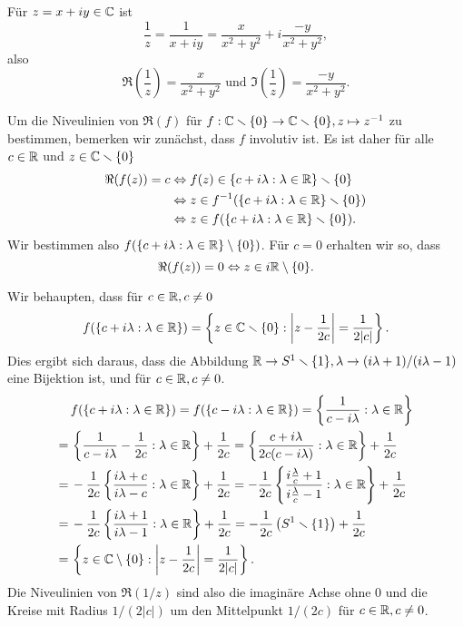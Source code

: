 \documentclass[a4paper,10pt]{article}
\begin{document}
Für $z = x+iy \in \mathbb{C}$ ist
\[
 \frac{1}{z} = \frac{1}{x+iy} = \frac{x}{x^2+y^2} + i\frac{-y}{x^2+y^2},
\]
also
\[
 \Re\left(\frac{1}{z}\right) = \frac{x}{x^2+y^2} \text{ und }
 \Im\left(\frac{1}{z}\right) = \frac{-y}{x^2+y^2}.
\]

Um die Niveulinien von $\Re(f)$ für $f : \mathbb{C} \smallsetminus \{0\} \to \mathbb{C} \smallsetminus \{0\}, z \mapsto z^{-1}$ zu bestimmen, bemerken wir zunächst, dass $f$ involutiv ist. Es ist daher für alle $c \in \mathbb{R}$ und $z \in \mathbb{C} \smallsetminus \{0\}$
\begin{align*}
 \Re(f(z)) = c
 &\Leftrightarrow f(z) \in \{c + i\lambda : \lambda \in \mathbb{R}\} \smallsetminus \{0\} \\
 &\Leftrightarrow z \in f^{-1}(\{c + i\lambda : \lambda \in \mathbb{R}\} \smallsetminus \{0\}) \\
 &\Leftrightarrow z \in f(\{c + i\lambda : \lambda \in \mathbb{R}\} \smallsetminus \{0\}).
\end{align*}
Wir bestimmen also $f(\{c+i\lambda : \lambda \in \mathbb{R}\} \setminus \{0\})$. Für $c = 0$ erhalten wir so, dass
\[
 \Re(f(z)) = 0 \Leftrightarrow z \in i\mathbb{R} \setminus\{0\}.
\]

Wir behaupten, dass für $c \in \mathbb{R}, c \neq 0$
\[
 f(\{c + i\lambda : \lambda \in \mathbb{R}\})
 = \left\{z \in \mathbb{C} \smallsetminus \{0\} : \left|z-\frac{1}{2c}\right| = \frac{1}{2|c|} \right\}.
\]
Dies ergibt sich daraus, dass die Abbildung $\mathbb{R} \to S^1 \smallsetminus\{1\}, \lambda \to (i\lambda+1)/(i\lambda-1)$ eine Bijektion ist, und für $c \in \mathbb{R}, c \neq 0$.
\begin{align*}
 &\,f(\{c+i\lambda : \lambda \in \mathbb{R}\})
 = f(\{c-i\lambda : \lambda \in \mathbb{R}\})
 = \left\{\frac{1}{c-i\lambda} : \lambda \in \mathbb{R}\right\} \\
 =&\, \left\{\frac{1}{c-i\lambda} - \frac{1}{2c} : \lambda \in \mathbb{R}\right\} + \frac{1}{2c}
 = \left\{\frac{c+i\lambda}{2c(c-i\lambda)} : \lambda \in \mathbb{R}\right\} + \frac{1}{2c} \\
 =&\, -\frac{1}{2c} \left\{\frac{i\lambda+c}{i\lambda-c} : \lambda \in \mathbb{R}\right\} + \frac{1}{2c}
 = -\frac{1}{2c} \left\{\frac{i\frac{\lambda}{c}+1}{i\frac{\lambda}{c}-1} : \lambda \in \mathbb{R}\right\} + \frac{1}{2c} \\
 =&\, -\frac{1}{2c} \left\{\frac{i\lambda+1}{i\lambda-1} : \lambda \in \mathbb{R}\right\} + \frac{1}{2c}
 = -\frac{1}{2c} \left(S^1 \smallsetminus\{1\}\right) + \frac{1}{2c} \\
 =&\, \left\{z \in \mathbb{C} \setminus\{0\} : \left|z-\frac{1}{2c}\right| = \frac{1}{2|c|}\right\}.
\end{align*}
Die Niveulinien von $\Re(1/z)$ sind also die imaginäre Achse ohne $0$ und die Kreise mit Radius $1/(2|c|)$ um den Mittelpunkt $1/(2c)$ für $c \in \mathbb{R}, c \neq 0$.
\end{document}
